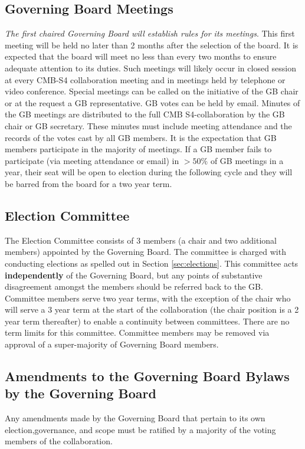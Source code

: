\documentclass[12pt]{article}
\begin{document}
\subsection{Governing Board Meetings}
\textit{The first chaired Governing Board will establish rules for its meetings}. This first meeting will be held no later than 2 months after the selection of the board.  It is expected that the board will meet no less than every two months to ensure adequate attention to its duties. Such meetings will likely occur in closed session at every CMB-S4 collaboration meeting and in meetings held by telephone or video conference. Special meetings can be called on the initiative of the GB chair or at the request a GB representative. 
GB votes can be held by email. Minutes of the GB meetings are distributed to the full CMB S4-collaboration by the GB chair or GB secretary. These minutes must include meeting attendance and the records of the votes cast by all GB members. It is the expectation that GB members participate in the majority of meetings. If a GB member fails to participate (via meeting attendance or email) in $>50\%$ of GB meetings in a year, their seat will be open to election during the following cycle and they will be barred from the board for a two year term.  

\subsection{Election Committee}
The Election Committee consists of 3 members (a chair and two additional members) appointed  by the Governing Board. The committee is charged with conducting elections as spelled out in Section \ref{sec:elections}. This committee acts \textbf{independently} of the Governing Board, but any points of substantive disagreement amongst the members should be referred back to the GB.  Committee members serve two year terms, with the exception of the chair who will serve a 3 year term at the start of the collaboration (the chair position is a 2 year term thereafter) to enable a continuity between committees. There are no term limits for this committee. Committee members may be removed via approval of a super-majority of Governing Board members. 
 
\subsection{Amendments to the Governing Board Bylaws by the Governing Board} \label{subsec:amend}
Any amendments made by the Governing Board that pertain to its own election,governance, and scope must be ratified by a majority of the voting members of the collaboration.
\end{document}
